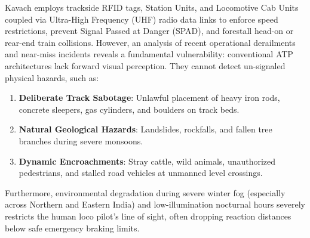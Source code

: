 \documentclass[conference]{IEEEtran}
\begin{document}
Kavach employs trackside RFID tags, Station Units, and Locomotive Cab Units coupled via Ultra-High Frequency (UHF) radio data links to enforce speed restrictions, prevent Signal Passed at Danger (SPAD), and forestall head-on or rear-end train collisions. However, an analysis of recent operational derailments and near-miss incidents reveals a fundamental vulnerability: conventional ATP architectures lack forward visual perception. They cannot detect un-signaled physical hazards, such as:
\begin{enumerate}
    \item \textbf{Deliberate Track Sabotage}: Unlawful placement of heavy iron rods, concrete sleepers, gas cylinders, and boulders on track beds.
    \item \textbf{Natural Geological Hazards}: Landslides, rockfalls, and fallen tree branches during severe monsoons.
    \item \textbf{Dynamic Encroachments}: Stray cattle, wild animals, unauthorized pedestrians, and stalled road vehicles at unmanned level crossings.
\end{enumerate}

Furthermore, environmental degradation during severe winter fog (especially across Northern and Eastern India) and low-illumination nocturnal hours severely restricts the human loco pilot's line of sight, often dropping reaction distances below safe emergency braking limits.
\end{document}
